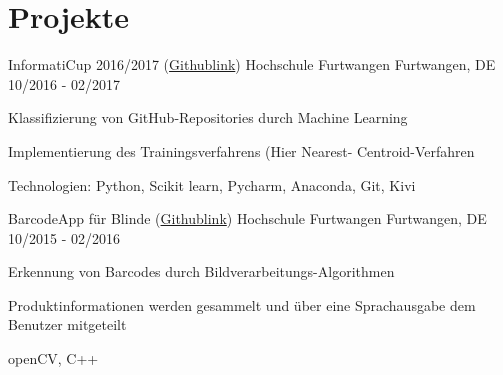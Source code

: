 \section{Projekte}
\cventry
{InformatiCup 2016/2017 (\href{https://github.com/QueensGambit/GitHubRepositoryClassifier}{Githublink})} %
{Hochschule Furtwangen} %
{Furtwangen, DE} %
{10/2016 - 02/2017} %
\begin{cvitems}
\item {Klassifizierung von GitHub-Repositories durch Machine Learning}
\item {Implementierung des Trainingsverfahrens (Hier Nearest-
Centroid-Verfahren}
\item {Technologien: Python, Scikit learn, Pycharm, Anaconda, Git, Kivi}
\end{cvitems}

\cventry
{BarcodeApp für Blinde (\href{https://github.com/QueensGambit/Barcode-App}{Githublink})} %
{Hochschule Furtwangen} %
{Furtwangen, DE} %
{10/2015 - 02/2016} %
\begin{cvitems}
\item {Erkennung von Barcodes durch Bildverarbeitungs-Algorithmen}
\item {Produktinformationen werden gesammelt und über eine Sprachausgabe dem Benutzer mitgeteilt}

\item {openCV, C++ }
\end{cvitems}